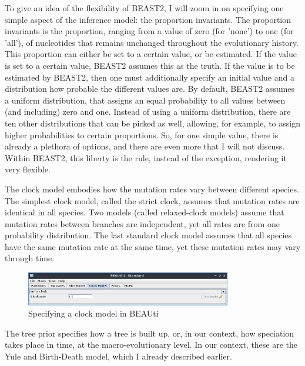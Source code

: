 To give an idea of the flexibility of BEAST2, I will zoom in on specifying
one simple aspect of the inference model: the proportion invariants.
The proportion invariants is the proportion, ranging from a value of zero (for 'none') 
to one (for 'all'), of nucleotides that remains unchanged throughout
the evolutionary history. This proportion can either be set to a certain 
value, or be estimated. If the value is set to a certain value, BEAST2 assumes
this as the truth. If the value is to be estimated by BEAST2, then
one must additionally specify an initial value and 
a distribution how probable the different values are. 
By default, BEAST2 assumes a uniform distribution,
that assigns an equal probability to all values between (and including)
zero and one. Instead of using a uniform distribution, 
there are ten other distributions that can be picked as well, allowing, for
example, to assign higher probabilities to certain proportions. 
So, for one simple value, there is already
a plethora of options, and there are even more that I will not discuss. 
Within BEAST2, this liberty is the rule, instead of the
exception, rendering it very flexible.

The clock model embodies how the mutation rates vary between
different species. The simplest clock model, called the strict clock,
assumes that mutation rates are identical in all species. 
Two models (called relaxed-clock models) assume that mutation rates
between branches are independent, yet all rates are from one probability distribution.
The last standard clock model assumes that all species have the same mutation
rate at the same time, yet these mutation rates may vary through time.


\begin{figure}[H]
  \includegraphics[width=0.8\textwidth]{beauti_clock_model.png}
  \caption{
    Specifying a clock model in BEAUti
 }
  \label{fig:beauti_clock_model}
\end{figure}

The tree prior specifies how a tree is built up, or, in our context,
how speciation takes place in time, at the macro-evolutionary level.
In our context, these are the Yule and Birth-Death model, which I already
described earlier.

